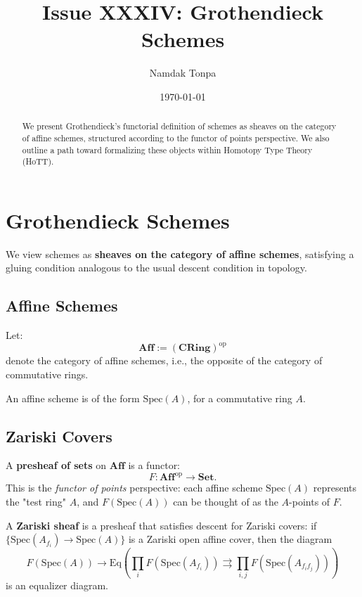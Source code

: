 \documentclass{article}
\begin{document}
\title{Issue XXXIV: Grothendieck Schemes}
\author{Namdak Tonpa}
\date{\today}

\maketitle

\begin{abstract}
We present Grothendieck’s functorial definition of schemes as sheaves on the category of affine schemes, structured according to the functor of points perspective. We also outline a path toward formalizing these objects within Homotopy Type Theory (HoTT).
\end{abstract}

\section{Grothendieck Schemes}

We view schemes as \textbf{sheaves on the category of affine schemes}, satisfying a gluing condition analogous to the usual descent condition in topology.

\subsection{Affine Schemes}

Let:
\[
\mathbf{Aff} := (\mathbf{CRing})^{\mathrm{op}}
\]
denote the category of affine schemes, i.e., the opposite of the category of commutative rings.

An affine scheme is of the form $\mathrm{Spec}(A)$, for a commutative ring $A$.

\subsection{Zariski Covers}

A \textbf{presheaf of sets} on $\mathbf{Aff}$ is a functor:
\[
F : \mathbf{Aff}^{\mathrm{op}} \to \mathbf{Set}.
\]
This is the \emph{functor of points} perspective: each affine scheme $\mathrm{Spec}(A)$ represents the "test ring" $A$, and $F(\mathrm{Spec}(A))$ can be thought of as the $A$-points of $F$.

A \textbf{Zariski sheaf} is a presheaf that satisfies descent for Zariski covers: if $\{ \mathrm{Spec}(A_{f_i}) \to \mathrm{Spec}(A) \}$ is a Zariski open affine cover, then the diagram
\[
F(\mathrm{Spec}(A)) \to \mathrm{Eq} \left( \prod_i F(\mathrm{Spec}(A_{f_i})) \rightrightarrows \prod_{i,j} F(\mathrm{Spec}(A_{f_i f_j})) \right)
\]
is an equalizer diagram.
\end{document}

